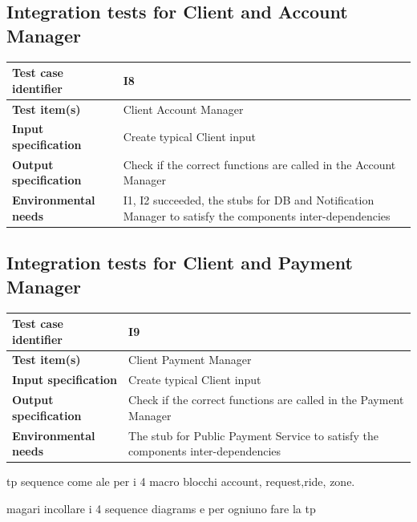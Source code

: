 \documentclass[a4paper,11pt]{report} %
\begin{document}
		\subsection{Integration tests for Client and Account Manager}
		\begin{center}
			\renewcommand{\arraystretch}{1.2}
			\setlength{\tabcolsep}{24pt}
			\begin{tabular}{ l  p{9cm}}\hline
				\textbf{Test case identifier} & I8\\\hline
				\textbf{Test item(s)} & Client \textrightarrow Account Manager\\\hline
				\textbf{Input specification} & Create typical Client input \\\hline
				\textbf{Output specification} & Check if the correct functions are called in the Account Manager\\\hline
				\textbf{Environmental needs} &  I1, I2 succeeded, the stubs for DB and Notification Manager to satisfy the components inter-dependencies\\\hline
			\end{tabular}
		\end{center}	

		\subsection{Integration tests for Client and Payment Manager}
		\begin{center}
			\renewcommand{\arraystretch}{1.2}
			\setlength{\tabcolsep}{24pt}
			\begin{tabular}{ l  p{9cm}}\hline
				\textbf{Test case identifier} & I9\\\hline
				\textbf{Test item(s)} & Client \textrightarrow Payment Manager\\\hline
				\textbf{Input specification} & Create typical Client input \\\hline
				\textbf{Output specification} & Check if the correct functions are called in the Payment Manager\\\hline
				\textbf{Environmental needs} &  The stub for Public Payment Service to satisfy the components inter-dependencies\\\hline
			\end{tabular}
		\end{center}				
			
	tp sequence come ale per i 4 macro blocchi account, request,ride, zone.
	
	magari incollare i 4 sequence diagrams e per ogniuno fare la tp
	
\end{document}
